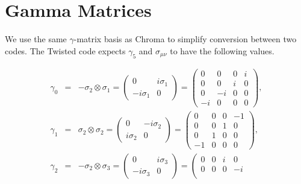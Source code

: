 \documentclass[twoside,openright,letterpaper]{article}
\begin{document}
\section{Gamma Matrices}
We use the same $\gamma$-matrix basis as Chroma to simplify conversion between
two codes. The Twisted code expects $\gamma_5$ and $\sigma_{\mu\nu}$
to have the following values.

\begin{eqnarray*}
\gamma_0 &=& -\sigma_2 \otimes \sigma_1  =
           \left(\begin{array}{cc}
                0&i\sigma_1\\
                -i\sigma_1&0
             \end{array}\right) = 
           \left(\begin{array}{cccc}
                                 0&0&0&i\\
                                 0&0&i&0\\
                                 0&-i&0&0\\
                                 -i&0&0&0
                           \end{array}\right),\\
\gamma_1 &=& \sigma_2 \otimes \sigma_2  = 
           \left(\begin{array}{cc}
                  0 & -i\sigma_2\\
                  i\sigma_2 & 0
                 \end{array}\right) = 
           \left(\begin{array}{cccc}
                                 0&0&0&-1\\
                                 0&0&1&0\\
                                 0&1&0&0\\
                                 -1&0&0&0
                           \end{array}\right),\\
\gamma_2 &=& -\sigma_2 \otimes \sigma_3  = 
           \left(\begin{array}{cc}
                   0 & i\sigma_3\\
                 -i\sigma_3&0
                 \end{array}\right) = 
           \left(\begin{array}{cccc}
                                 0&0&i&0\\
                                 0&0&0&-i\\

\end{array}
\end{eqnarray*}
\end{document}

